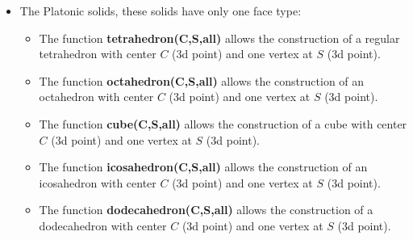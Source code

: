 \begin{itemize}
    \item The Platonic solids, these solids have only one face type:
\begin{itemize}
    \item The function \textbf{tetrahedron(C,S,all)} allows the construction of a regular tetrahedron with center $C$ (3d point) and one vertex at $S$ (3d point).
    \item The function \textbf{octahedron(C,S,all)} allows the construction of an octahedron with center $C$ (3d point) and one vertex at $S$ (3d point).
    \item The function \textbf{cube(C,S,all)} allows the construction of a cube with center $C$ (3d point) and one vertex at $S$ (3d point).
    \item The function \textbf{icosahedron(C,S,all)} allows the construction of an icosahedron with center $C$ (3d point) and one vertex at $S$ (3d point).
    \item The function \textbf{dodecahedron(C,S,all)} allows the construction of a dodecahedron with center $C$ (3d point) and one vertex at $S$ (3d point).
\end{itemize}


\end{itemize}
